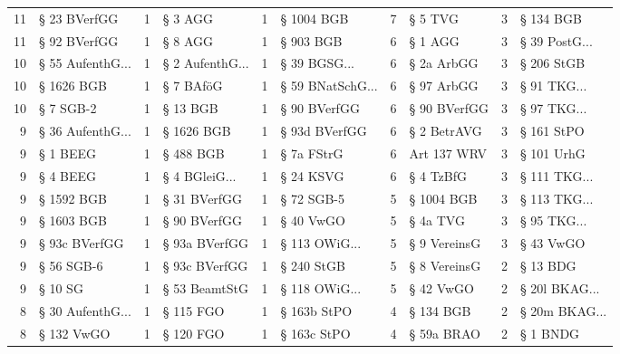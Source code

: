 \begin{tabular}{rlrlrlrlrl}
       11 &       § 23 BVerfGG &         1 &           § 3 AGG &         1 &         § 1004 BGB &         7 &      § 5 TVG &          3 &       § 134 BGB \\
       11 &       § 92 BVerfGG &         1 &           § 8 AGG &         1 &          § 903 BGB &         6 &      § 1 AGG &          3 & § 39 PostG... \\
       10 & § 55 AufenthG... &         1 & § 2 AufenthG... &         1 &     § 39 BGSG... &         6 &   § 2a ArbGG &          3 &      § 206 StGB \\
       10 &         § 1626 BGB &         1 &         § 7 BAföG &         1 & § 59 BNatSchG... &         6 &   § 97 ArbGG &          3 &   § 91 TKG... \\
       10 &          § 7 SGB-2 &         1 &          § 13 BGB &         1 &       § 90 BVerfGG &         6 & § 90 BVerfGG &          3 &   § 97 TKG... \\
        9 & § 36 AufenthG... &         1 &        § 1626 BGB &         1 &      § 93d BVerfGG &         6 &  § 2 BetrAVG &          3 &      § 161 StPO \\
        9 &           § 1 BEEG &         1 &         § 488 BGB &         1 &         § 7a FStrG &         6 &  Art 137 WRV &          3 &      § 101 UrhG \\
        9 &           § 4 BEEG &         1 &   § 4 BGleiG... &         1 &          § 24 KSVG &         6 &    § 4 TzBfG &          3 &  § 111 TKG... \\
        9 &         § 1592 BGB &         1 &      § 31 BVerfGG &         1 &         § 72 SGB-5 &         5 &   § 1004 BGB &          3 &  § 113 TKG... \\
        9 &         § 1603 BGB &         1 &      § 90 BVerfGG &         1 &          § 40 VwGO &         5 &     § 4a TVG &          3 &   § 95 TKG... \\
        9 &      § 93c BVerfGG &         1 &     § 93a BVerfGG &         1 &    § 113 OWiG... &         5 & § 9 VereinsG &          3 &       § 43 VwGO \\
        9 &         § 56 SGB-6 &         1 &     § 93c BVerfGG &         1 &         § 240 StGB &         5 & § 8 VereinsG &          2 &        § 13 BDG \\
        9 &            § 10 SG &         1 &     § 53 BeamtStG &         1 &    § 118 OWiG... &         5 &    § 42 VwGO &          2 & § 20l BKAG... \\
        8 & § 30 AufenthG... &         1 &         § 115 FGO &         1 &        § 163b StPO &         4 &    § 134 BGB &          2 & § 20m BKAG... \\
        8 &         § 132 VwGO &         1 &         § 120 FGO &         1 &        § 163c StPO &         4 &   § 59a BRAO &          2 &        § 1 BNDG \\
\bottomrule
\end{tabular}

\